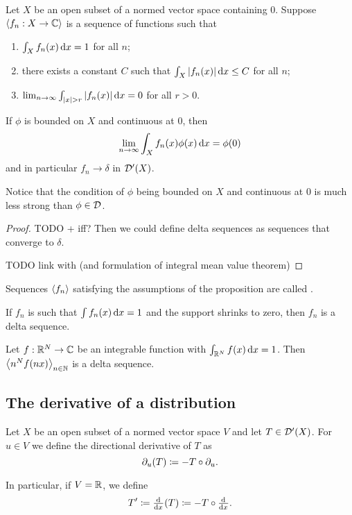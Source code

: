 \begin{proposition}
Let $X$ be an open subset of a normed vector space containing $0$. Suppose $\left\langle f_n: X\to \mathbb{C} \right\rangle$ is a sequence of functions such that
\begin{enumerate}
\item $\int_X f_n(x)\operatorname{d \!}{x} = 1$ for all $n$;
\item there exists a constant $C$ such that $\int_X |f_n(x)|\operatorname{d \!}{x} \leq C$ for all $n$;
\item $\lim_{n\to \infty} \int_{|x|>r}|f_n(x)|\diff{x} = 0 $ for all $r > 0$.
\end{enumerate}
If $\phi$ is bounded on $X$ and continuous at $0$, then
\[ \lim_{n\to \infty} \int_X f_n(x)\phi(x)\operatorname{d \!}{x} = \phi(0) \]
and in particular $f_n\to \delta$ in $\operatorname{\mathcal{D}^\prime}(X)$.
\end{proposition}
Notice that the condition of $\phi$ being bounded on $X$ and continuous at $0$ is much less strong than $\phi\in\operatorname{\mathcal{D}}$.
\begin{proof}
TODO + iff? Then we could define delta sequences as sequences that converge to $\delta$.

TODO link with (and formulation of integral mean value theorem)
\end{proof}
Sequences $\left\langle f_n \right\rangle$ satisfying the assumptions of the proposition are called .

\begin{lemma}
If $f_n$ is such that $\int f_n(x) \operatorname{d \!}{x} = 1$ and the support shrinks to zero, then $f_n$ is a delta sequence.
\end{lemma}

\begin{lemma}
Let $f: \mathbb{R}^N\to\mathbb{C}$ be an integrable function with $\int_{\mathbb{R}^N}f(x)\operatorname{d \!}{x} = 1$. Then $\left\langle n^Nf(nx) \right\rangle_{n\in \mathbb{N}}$ is a delta sequence.
\end{lemma}

\subsection{The derivative of a distribution}
\begin{definition}
Let $X$ be an open subset of a normed vector space $V$ and let $T\in \operatorname{\mathcal{D}^\prime}(X)$. For $u\in V$ we define the directional derivative of $T$ as
\[ \partial_u(T) \coloneqq - T\circ \partial_u. \]

In particular, if $V = \mathbb{R}$, we define
\[ T' \defeq \od{}{x}(T) \defeq - T\circ \od{}{x}. \]
\end{definition}

